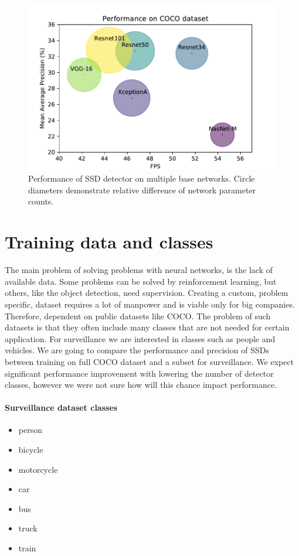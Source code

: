 \begin{figure}
    \centering
    \includegraphics[width=\textwidth]{img/fps_map_c}
    \caption[Performance of SSD with multiple base networks on COCO dataset]{Performance of SSD detector on multiple base networks. Circle diameters demonstrate relative difference of network parameter counts.}
    \label{fig:cocoperf}
\end{figure}

\section{Training data and classes}
The main problem of solving problems with neural networks, is the lack of available data. Some problems can be solved by reinforcement learning, but others, like the object detection, need supervision. Creating a custom, problem specific, dataset requires a lot of manpower and is viable only for big companies. Therefore, dependent on public datasets like COCO. The problem of such datasets is that they often include many classes that are not needed for certain application. For surveillance we are interested in classes such as people and vehicles. We are going to compare the performance and precision of SSDs between training on full COCO dataset and a subset for surveillance. We expect significant performance improvement with lowering the number of detector classes, however we were not sure how will this chance impact performance. 

\paragraph{Surveillance dataset classes}
\begin{multicols}{2}
    \begin{itemize}
        \item person
        \item bicycle
        \item motorcycle
        \item car
        \item bus
        \item truck
        \item train
    \end{itemize}
\end{multicols}

